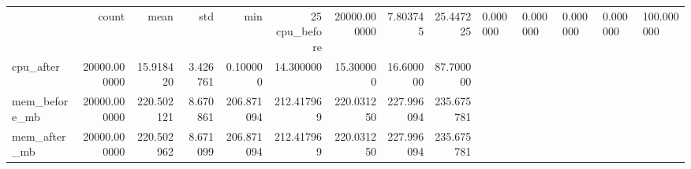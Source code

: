 \begin{tabular}{lrrrrrrrr}
\toprule
 & count & mean & std & min & 25%
\midrule
cpu_before & 20000.000000 & 7.803745 & 25.447225 & 0.000000 & 0.000000 & 0.000000 & 0.000000 & 100.000000 \\
cpu_after & 20000.000000 & 15.918420 & 3.426761 & 0.100000 & 14.300000 & 15.300000 & 16.600000 & 87.700000 \\
mem_before_mb & 20000.000000 & 220.502121 & 8.670861 & 206.871094 & 212.417969 & 220.031250 & 227.996094 & 235.675781 \\
mem_after_mb & 20000.000000 & 220.502962 & 8.671099 & 206.871094 & 212.417969 & 220.031250 & 227.996094 & 235.675781 \\
\bottomrule
\end{tabular}
